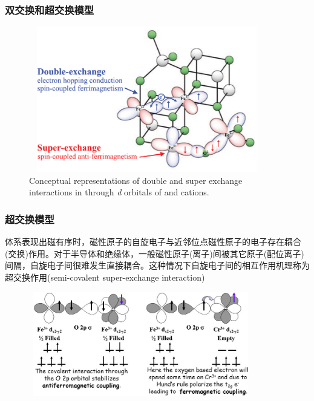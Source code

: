 \frame
{
	\frametitle{双交换和超交换模型}
\begin{figure}[h!]
	\vspace{-0.35in}
\centering
\includegraphics[height=2.50in,width=4.05in,viewport=0 0 205 140,clip]{Figures/Conceptual-representations-of-double-and-super-exchange-interactions-in-Fe3O4-through-d.png}
\caption{\tiny \textrm{Conceptual representations of double and super exchange interactions in  through \textit{d} orbitals of  and  cations.}}%
\label{double-super-exchange-1}
\end{figure}
}

\frame
{
	\frametitle{超交换模型}
	体系表现出磁有序时，磁性原子的自旋电子与近邻位点磁性原子的电子存在耦合(交换)作用。对于半导体和绝缘体，一般磁性原子(离子)间被其它原子(配位离子)间隔，自旋电子间很难发生直接耦合。这种情况下自旋电子间的相互作用机理称为超交换作用\textrm{(semi-covalent super-exchange interaction)}
\begin{figure}[h!]
	\vspace{-3.5pt}
\centering
\includegraphics[height=1.80in,width=3.85in,viewport=0 0 660 320,clip]{Figures/Super-exchange-model.jpg}
\label{super-exchange-O}
\end{figure}
}

